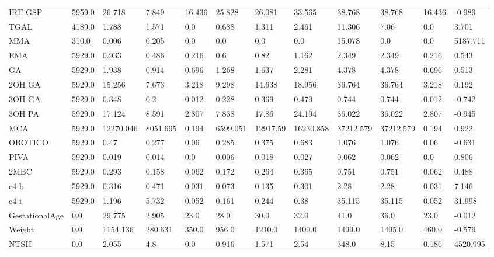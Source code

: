 \begin{tabular}{llllllllllll}
IRT-GSP & 5959.0 & 26.718 & 7.849 & 16.436 & 25.828 & 26.081 & 33.565 & 38.768 & 38.768 & 16.436 & -0.989 \\
TGAL & 4189.0 & 1.788 & 1.571 & 0.0 & 0.688 & 1.311 & 2.461 & 11.306 & 7.06 & 0.0 & 3.701 \\
MMA & 310.0 & 0.006 & 0.205 & 0.0 & 0.0 & 0.0 & 0.0 & 15.078 & 0.0 & 0.0 & 5187.711 \\
EMA & 5929.0 & 0.933 & 0.486 & 0.216 & 0.6 & 0.82 & 1.162 & 2.349 & 2.349 & 0.216 & 0.543 \\
GA & 5929.0 & 1.938 & 0.914 & 0.696 & 1.268 & 1.637 & 2.281 & 4.378 & 4.378 & 0.696 & 0.513 \\
2OH GA & 5929.0 & 15.256 & 7.673 & 3.218 & 9.298 & 14.638 & 18.956 & 36.764 & 36.764 & 3.218 & 0.192 \\
3OH GA & 5929.0 & 0.348 & 0.2 & 0.012 & 0.228 & 0.369 & 0.479 & 0.744 & 0.744 & 0.012 & -0.742 \\
3OH PA & 5929.0 & 17.124 & 8.591 & 2.807 & 7.838 & 17.86 & 24.194 & 36.022 & 36.022 & 2.807 & -0.945 \\
MCA & 5929.0 & 12270.046 & 8051.695 & 0.194 & 6599.051 & 12917.59 & 16230.858 & 37212.579 & 37212.579 & 0.194 & 0.922 \\
OROTICO & 5929.0 & 0.47 & 0.277 & 0.06 & 0.285 & 0.375 & 0.683 & 1.076 & 1.076 & 0.06 & -0.631 \\
PIVA & 5929.0 & 0.019 & 0.014 & 0.0 & 0.006 & 0.018 & 0.027 & 0.062 & 0.062 & 0.0 & 0.806 \\
2MBC & 5929.0 & 0.293 & 0.158 & 0.062 & 0.172 & 0.264 & 0.365 & 0.751 & 0.751 & 0.062 & 0.488 \\
c4-b & 5929.0 & 0.316 & 0.471 & 0.031 & 0.073 & 0.135 & 0.301 & 2.28 & 2.28 & 0.031 & 7.146 \\
c4-i & 5929.0 & 1.196 & 5.732 & 0.052 & 0.161 & 0.244 & 0.38 & 35.115 & 35.115 & 0.052 & 31.998 \\
GestationalAge & 0.0 & 29.775 & 2.905 & 23.0 & 28.0 & 30.0 & 32.0 & 41.0 & 36.0 & 23.0 & -0.012 \\
Weight & 0.0 & 1154.136 & 280.631 & 350.0 & 956.0 & 1210.0 & 1400.0 & 1499.0 & 1495.0 & 460.0 & -0.579 \\
NTSH & 0.0 & 2.055 & 4.8 & 0.0 & 0.916 & 1.571 & 2.54 & 348.0 & 8.15 & 0.186 & 4520.995 \\
\bottomrule
\end{tabular}
